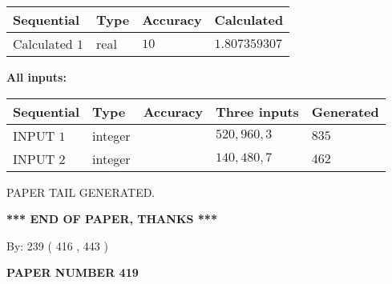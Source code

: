 \documentclass{ctexart}
\begin{document}
   
  
  
\noindent\begin{tabular}{|l|l|l|l|}
\hline
 Sequential & Type & Accuracy & Calculated \\ 
\hline
 
 
  Calculated $  1 $ & real & $  10  $ & 
 $ 1.807359307 $ 
 \\  \hline  
 \end{tabular}
   
   
   
   
\noindent\vspace{0.1in}\hspace{-0.08in} {\textbf{\Large{All inputs: }}}
   
   
  
  
\noindent\begin{tabular}{|l|l|l|l|l|}
\hline
 Sequential & Type & Accuracy & Three inputs & Generated \\ 
\hline
 
 
  INPUT $  1 $ & integer &  & $
 520
 , 
 960
 , 
 3
 $ & $ 835 $ 
 \\  \hline  
 
 
  INPUT $  2 $ & integer &  & $
 140
 , 
 480
 , 
 7
 $ & $ 462 $ 
 \\  \hline  
 \end{tabular}
   
   
   
   
   
   
 \vspace{0.2in}
 
   
   
\vspace{2.0in} PAPER TAIL GENERATED.
   
   
   
   
\vspace{1.0in} 
{\textbf{\large{ *** END OF PAPER, THANKS *** }}} 
   
   
\hspace{1.0in} By: 
 239 ( 416 ,  443 )
   
   
   
   
\newpage 
\setcounter{page}{ 
   419001 } 
   
   
   
   
 {\textbf{ \Large{ PAPER NUMBER  419  }}}
   
   
\vspace{0.2in}
   
   
   
\end{document}
